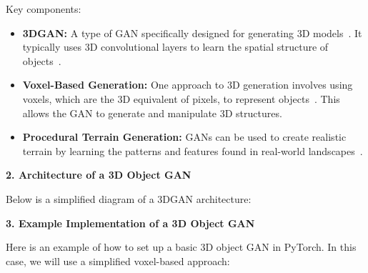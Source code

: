 Key components:
\begin{itemize}
    \item \textbf{3DGAN:} A type of GAN specifically designed for generating 3D models~\cite{cirillo2021vox2vox}. It typically uses 3D convolutional layers to learn the spatial structure of objects~\cite{ko20233d}.
    \item \textbf{Voxel-Based Generation:} One approach to 3D generation involves using voxels, which are the 3D equivalent of pixels, to represent objects~\cite{cirillo2021vox2vox}. This allows the GAN to generate and manipulate 3D structures.
    \item \textbf{Procedural Terrain Generation:} GANs can be used to create realistic terrain by learning the patterns and features found in real-world landscapes~\cite{spick2019realistic}.
\end{itemize}

\textbf{2. Architecture of a 3D Object GAN}

Below is a simplified diagram of a 3DGAN architecture:

\begin{center}
\end{center}

\textbf{3. Example Implementation of a 3D Object GAN}

Here is an example of how to set up a basic 3D object GAN in PyTorch. In this case, we will use a simplified voxel-based approach:


